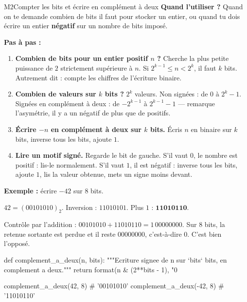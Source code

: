 \begin{fichemethode}{M2}{Compter les bits et écrire en complément à deux}
\textbf{Quand l'utiliser ?} Quand on te demande combien de bits il faut pour stocker un
entier, ou quand tu dois écrire un entier \textbf{négatif} sur un nombre de bits imposé.

\textbf{Pas à pas :}
\begin{enumerate}
  \item \textbf{Combien de bits pour un entier positif $n$ ?} Cherche la plus petite
    puissance de $2$ strictement supérieure à $n$. Si $2^{k-1} \leqslant n < 2^{k}$, il faut
    $k$ bits. Autrement dit : compte les chiffres de l'écriture binaire.
  \item \textbf{Combien de valeurs sur $k$ bits ?} $2^{k}$ valeurs. Non signées :
    de $0$ à $2^{k}-1$. Signées en complément à deux : de $-2^{k-1}$ à $2^{k-1}-1$ —
    remarque l'asymétrie, il y a un négatif de plus que de positifs.
  \item \textbf{Écrire $-n$ en complément à deux sur $k$ bits.} Écris $n$ en binaire sur
    $k$ bits, inverse tous les bits, ajoute $1$.
  \item \textbf{Lire un motif signé.} Regarde le bit de gauche. S'il vaut $0$, le nombre est
    positif : lis-le normalement. S'il vaut $1$, il est négatif : inverse tous les bits,
    ajoute $1$, lis la valeur obtenue, mets un signe moins devant.
\end{enumerate}

\textbf{Exemple :} écrire $-42$ sur $8$ bits.

$42 = (00101010)_2$. Inversion : $11010101$. Plus $1$ : $\mathbf{11010110}$.

Contrôle par l'addition : $00101010 + 11010110 = 1\,00000000$. Sur $8$ bits, la retenue
sortante est perdue et il reste $00000000$, c'est-à-dire $0$. C'est bien l'opposé.

\begin{python}
def complement_a_deux(n, bits):
    """Ecriture signee de n sur `bits` bits, en complement a deux."""
    return format(n & (2**bits - 1), "0%

complement_a_deux(42, 8)    # '00101010'
complement_a_deux(-42, 8)   # '11010110'
\end{python}


\end{fichemethode}
